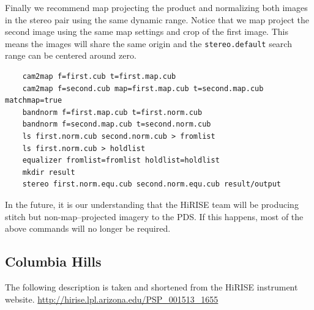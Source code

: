 Finally we recommend map projecting the product and normalizing both
images in the stereo pair using the same dynamic range. Notice that we
map project the second image using the same map settings and crop of
the first image. This means the images will share the same origin and
the {\tt stereo.default} search range can be centered around zero.

\begin{verbatim}
    cam2map f=first.cub t=first.map.cub
    cam2map f=second.cub map=first.map.cub t=second.map.cub matchmap=true
    bandnorm f=first.map.cub t=first.norm.cub
    bandnorm f=second.map.cub t=second.norm.cub
    ls first.norm.cub second.norm.cub > fromlist
    ls first.norm.cub > holdlist
    equalizer fromlist=fromlist holdlist=holdlist
    mkdir result
    stereo first.norm.equ.cub second.norm.equ.cub result/output
\end{verbatim}

In the future, it is our understanding that the HiRISE team will be
producing stitch but non-map--projected imagery to the PDS. If this
happens, most of the above commands will no longer be required.

\subsection{Columbia Hills}

The following description is taken and shortened from the HiRISE
instrument website.
\url{http://hirise.lpl.arizona.edu/PSP_001513_1655}

